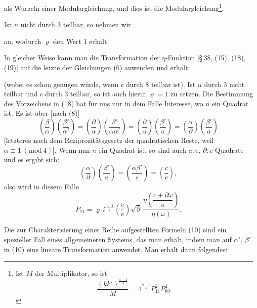
als Wurzeln einer Modulargleichung, und dies ist die 
Modulargleichung\footnote{Ist $M$ der  Multiplikator, so ist
\[
\frac{(kk')^{\frac{n-1}{3}}}{M} = 4^{\frac{n-1}{3}} P_{11}^2 P_{00}^4.
\]}.

Ist $n$ nicht durch 3 teilbar, so nehmen wir


an, wodurch $\varrho$ den Wert 1 erhält.

In gleicher Weise kann man die Transformation der $\eta$-Funktion
[§\,38, (15), (18), (19)] auf die letzte der Gleichungen (6) anwenden und
erhält:


(wobei es schon genügen würde, wenn $c$ durch 8 teilbar ist). Ist $n$ durch
3 nicht teilbar und $c$ durch 3 teilbar, so ist auch hierin $\varrho=1$ zu
setzen. Die Bestimmung des Vorzeichens in (18) hat für uns nur in dem Falle
Interesse, wo $n$ ein Quadrat ist. Es ist aber [nach (8)]
\[
\left(\frac{\beta}{\alpha}\right)\left(\frac{\beta'}{\alpha'}\right) = \left(\frac{\partial}{\alpha}\right)\left(\frac{\beta'}{\alpha\alpha'}\right) = \left(\frac{\partial}{\alpha}\right)\left(\frac{\beta'}{a}\right) = \left(\frac{\alpha}{\partial}\right)\left(\frac{\beta'}{a}\right)
\]
[letzteres nach dem Reziprozitätsgesetz der quadratischen Reste, weil
$\alpha \equiv 1\ (\mathrm{mod}\ 4)$]. Wenn nun $n$ ein Quadrat ist, so sind
auch $a\!:\!e$, $\partial\!:\!e$ Quadrate und es ergibt sich:
\[
\left(\frac{\alpha}{\partial}\right)\left(\frac{\beta'}{a}\right) = \left(\frac{\alpha\beta'}{e}\right) = \left(\frac{c}{e}\right),
\]
also wird in diesem Falle
\[
P_{11} = \varrho\, i^{\frac{a-1}{2}}\left(\frac{c}{e}\right)\sqrt{\partial}\,\frac{\eta\left(\dfrac{c+\partial\omega}{a}\right)}{\eta(\omega)}.
\]

Die zur Charakterisierung einer Reihe aufgestellten Formeln (10) sind ein
spezieller Fall eines allgemeineren Systems, das man erhält, indem man auf
$\alpha'$, $\beta'$ in (10) eine lineare Transformation anwendet. Man
erhält dann folgendes:
